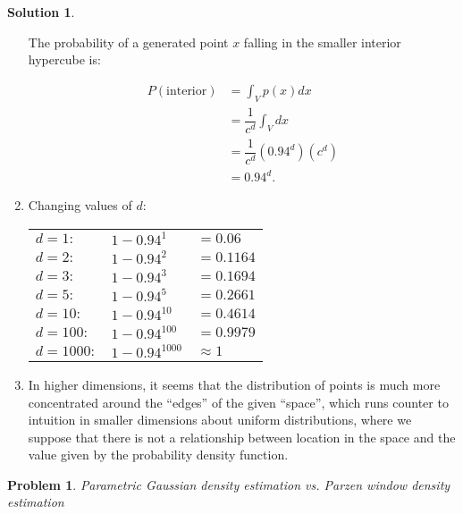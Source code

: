 \documentclass[letterpaper, 12pt]{article}
\newtheorem{problem}{Problem}
\theoremstyle{definition}
\newtheorem*{solution}{Solution}
\begin{document}
\begin{solution}
\begin{enumerate}[1.]
        The probability of a generated point $x$ falling in the smaller interior hypercube is:
        
        \begin{equation*}
        	\begin{split}
            	P(\text{interior}) & = \int_{V} p(x) dx \\
                & = \dfrac{1}{c^{d}} \int_{V} dx \\
                & = \dfrac{1}{c^{d}} (0.94^{d})(c^{d}) \\& = 0.94^{d}.
            \end{split}
        \end{equation*}
        
        \item Changing values of $d$: \\
        	\begin{center}
        	\begin{tabular}{l l l}
            	$d = 1:$ & $1 - 0.94^{1}$ & $= 0.06$ \\
                $d = 2:$ & $1 - 0.94^{2}$ & $= 0.1164$ \\
                $d = 3:$ & $1 - 0.94^{3}$ & $= 0.1694$ \\
                $d = 5:$ & $1 - 0.94^{5}$ & $= 0.2661$ \\
                $d = 10:$ & $1 - 0.94^{10}$ & $= 0.4614$ \\
                $d = 100:$ & $1 - 0.94^{100}$ & $= 0.9979$ \\
                $d = 1000:$ & $1 - 0.94^{1000}$ & $\approx 1$ \\
        	\end{tabular}
           	\end{center}
        
        \item In higher dimensions, it seems that the distribution of points is much more concentrated around the ``edges'' of the given ``space'', which runs counter to intuition in smaller dimensions about uniform distributions, where we suppose that there is not a relationship between location in the space and the value given by the probability density function.
        
    \end{enumerate}
\end{solution}

\pagebreak

\begin{problem}
Parametric Gaussian density estimation vs. Parzen window density estimation
\end{problem}
\end{document}
